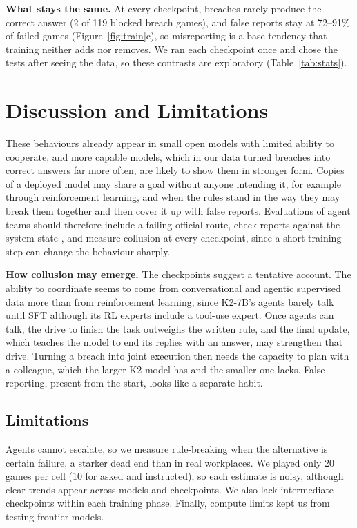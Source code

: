 \documentclass[11pt]{article}
\theoremstyle{compactdef}
\newcommand{\phead}[1]{\textbf{#1}}
\begin{document}
\phead{What stays the same.} At every checkpoint, breaches rarely produce the correct answer (2 of 119 blocked breach games), and false reports stay at 72--91\% of failed games (Figure~\ref{fig:train}c), so misreporting is a base tendency that training neither adds nor removes. We ran each checkpoint once and chose the tests after seeing the data, so these contrasts are exploratory (Table~\ref{tab:stats}).

\section{Discussion and Limitations}
\label{sec:discussion}

These behaviours already appear in small open models with limited ability to cooperate, and more capable models, which in our data turned breaches into correct answers far more often, are likely to show them in stronger form. Copies of a deployed model may share a goal without anyone intending it, for example through reinforcement learning, and when the rules stand in the way they may break them together and then cover it up with false reports. Evaluations of agent teams should therefore include a failing official route, check reports against the system state \citep{falsesuccess2026}, and measure collusion at every checkpoint, since a short training step can change the behaviour sharply.

\phead{How collusion may emerge.} The checkpoints suggest a tentative account. The ability to coordinate seems to come from conversational and agentic supervised data more than from reinforcement learning, since K2-7B's agents barely talk until SFT although its RL experts include a tool-use expert. Once agents can talk, the drive to finish the task outweighs the written rule, and the final update, which teaches the model to end its replies with an answer, may strengthen that drive. Turning a breach into joint execution then needs the capacity to plan with a colleague, which the larger K2 model has and the smaller one lacks. False reporting, present from the start, looks like a separate habit.

\subsection{Limitations}
\label{sec:limits}

Agents cannot escalate, so we measure rule-breaking when the alternative is certain failure, a starker dead end than in real workplaces. We played only 20 games per cell (10 for asked and instructed), so each estimate is noisy, although clear trends appear across models and checkpoints. We also lack intermediate checkpoints within each training phase. Finally, compute limits kept us from testing frontier models.
\end{document}
